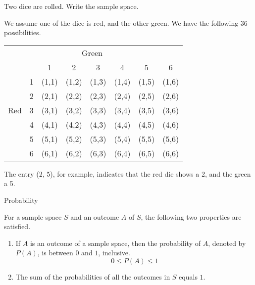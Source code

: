 \begin{example}\label{example_sample_space_rolling_two_dice}
    Two dice are rolled. Write the sample space.
\end{example}
\begin{solution}
    We assume one of the dice is red, and the other green. We have the following 36 possibilities.

    \begin{center}
        \begin{tabular}{cc|cccccc}
            \multicolumn{1}{c}{} & \multicolumn{6}{c}{Green}                                                 \\
                                 &                           & 1     & 2     & 3     & 4     & 5     & 6     \\
            \cline{2-8}
                                 & 1                         & (1,1) & (1,2) & (1,3) & (1,4) & (1,5) & (1,6) \\
                                 & 2                         & (2,1) & (2,2) & (2,3) & (2,4) & (2,5) & (2,6) \\
            Red                  & 3                         & (3,1) & (3,2) & (3,3) & (3,4) & (3,5) & (3,6) \\
                                 & 4                         & (4,1) & (4,2) & (4,3) & (4,4) & (4,5) & (4,6) \\
                                 & 5                         & (5,1) & (5,2) & (5,3) & (5,4) & (5,5) & (5,6) \\
                                 & 6                         & (6,1) & (6,2) & (6,3) & (6,4) & (6,5) & (6,6) \\
        \end{tabular}
    \end{center}

    The entry (2, 5), for example, indicates that the red die shows a 2, and the green a 5.
\end{solution}

\begin{summarybox}{Probability}

    For a sample space $S$ and an outcome $A$ of $S$, the following two properties are satisfied.
    \begin{enumerate}
        \item If $A$ is an outcome of a sample space, then the probability of $A$, denoted by $P(A)$, is between $0$ and $1$, inclusive.
              \[ 0 \leq P(A) \leq 1 \]
        \item The sum of the probabilities of all the outcomes in $S$ equals $1$.
    \end{enumerate}
\end{summarybox}

